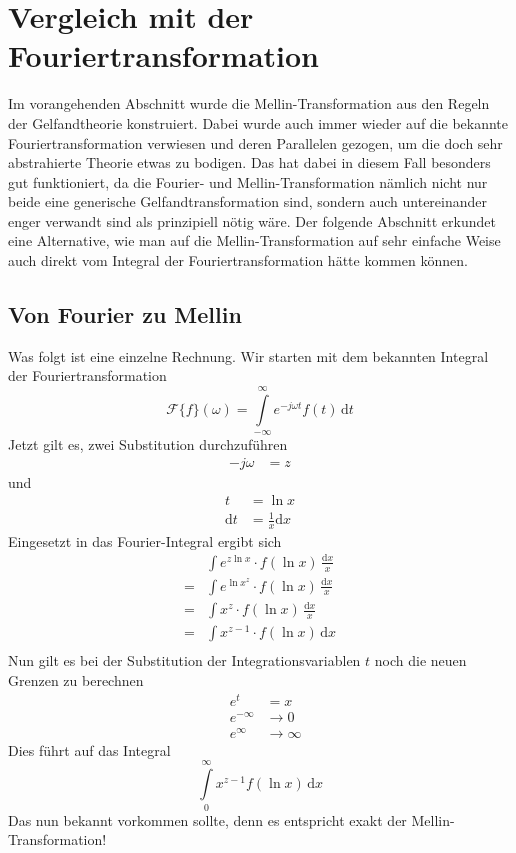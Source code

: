 %
%
%
%
\section{Vergleich mit der Fouriertransformation
\label{mellin:section:teil3}}
Im vorangehenden Abschnitt wurde die Mellin-Transformation aus den 
Regeln der Gelfandtheorie konstruiert. 
Dabei wurde auch immer wieder auf die bekannte Fouriertransformation 
verwiesen und deren Parallelen gezogen, um die doch sehr abstrahierte 
Theorie etwas zu bodigen.
Das hat dabei in diesem Fall besonders gut funktioniert, da die Fourier- 
und Mellin-Transformation nämlich nicht nur beide eine generische 
Gelfandtransformation sind, sondern auch untereinander enger verwandt 
sind als prinzipiell nötig wäre.
Der folgende Abschnitt erkundet eine Alternative, wie man auf die 
Mellin-Transformation auf sehr einfache Weise auch direkt vom Integral 
der Fouriertransformation hätte kommen können.

\subsection{Von Fourier zu Mellin
\label{mellin:subsection:foumel}}
Was folgt ist eine einzelne Rechnung.
Wir starten mit dem bekannten Integral der Fouriertransformation
\begin{equation}
    \mathcal{F}\{f \}(\omega) = 
    \int\limits_{-\infty}^{\infty} e^{-j\omega{}t} f(t) \,\mathrm{d}t
    \label{mellin:fourier}
\end{equation}
Jetzt gilt es, zwei Substitution durchzuführen
\[
    \begin{aligned}
        -j\omega &= z
    \end{aligned}
\]
und
\[
    \begin{aligned}
        t &= \ln x \\
        \mathrm{d}t &= \frac{1}{x} \mathrm{d}x
    \end{aligned}
\]
Eingesetzt in das Fourier-Integral ergibt sich
\[
    \begin{aligned}
    &\int e^{z \ln x} \cdot f(\ln x) \,\frac{\mathrm{d}x}{x} \\
    = &\int e^{\ln x^z} \cdot f(\ln x) \,\frac{\mathrm{d}x}{x} \\
    = &\int x^{z} \cdot f(\ln x) \,\frac{\mathrm{d}x}{x} \\
    = &\int x^{z-1} \cdot f(\ln x) \,\mathrm{d}x \\
    \end{aligned}
\]
Nun gilt es bei der Substitution der Integrationsvariablen $t$ noch die 
neuen Grenzen zu berechnen
\[
    \begin{aligned}
        &e^{t} &= x \\
        &e^{-\infty} &\rightarrow 0 \\
        &e^{\infty} &\rightarrow \infty 
    \end{aligned}
\]
Dies führt auf das Integral
\[
    \int\limits_{0}^{\infty} x^{z-1} f(\ln x) \,\mathrm{d}x
\]
Das nun bekannt vorkommen sollte, denn es entspricht exakt der 
Mellin-Transformation!
\medskip

